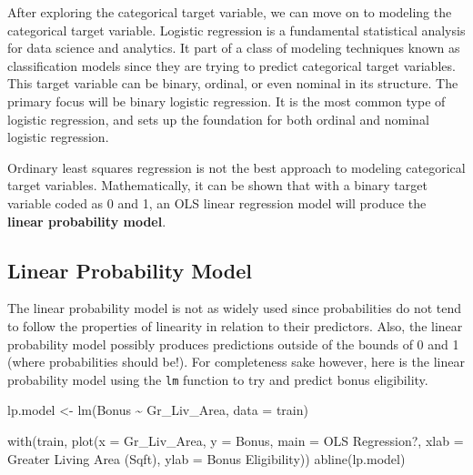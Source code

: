 \documentclass[
  letterpaper,
  DIV=11,
  numbers=noendperiod]{scrreprt}
\newenvironment{Shaded}{\begin{snugshade}}{\end{snugshade}}
\newcommand{\AttributeTok}[1]{\textcolor[rgb]{0.40,0.45,0.13}{#1}}
\newcommand{\FunctionTok}[1]{\textcolor[rgb]{0.28,0.35,0.67}{#1}}
\newcommand{\NormalTok}[1]{\textcolor[rgb]{0.00,0.23,0.31}{#1}}
\newcommand{\OtherTok}[1]{\textcolor[rgb]{0.00,0.23,0.31}{#1}}
\newcommand{\SpecialCharTok}[1]{\textcolor[rgb]{0.37,0.37,0.37}{#1}}
\newcommand{\StringTok}[1]{\textcolor[rgb]{0.13,0.47,0.30}{#1}}
\begin{document}
After exploring the categorical target variable, we can move on to
modeling the categorical target variable. Logistic regression is a
fundamental statistical analysis for data science and analytics. It part
of a class of modeling techniques known as classification models since
they are trying to predict categorical target variables. This target
variable can be binary, ordinal, or even nominal in its structure. The
primary focus will be binary logistic regression. It is the most common
type of logistic regression, and sets up the foundation for both ordinal
and nominal logistic regression.

Ordinary least squares regression is not the best approach to modeling
categorical target variables. Mathematically, it can be shown that with
a binary target variable coded as 0 and 1, an OLS linear regression
model will produce the \textbf{linear probability model}.

\hypertarget{linear-probability-model}{%
\subsection{Linear Probability Model}\label{linear-probability-model}}

The linear probability model is not as widely used since probabilities
do not tend to follow the properties of linearity in relation to their
predictors. Also, the linear probability model possibly produces
predictions outside of the bounds of 0 and 1 (where probabilities should
be!). For completeness sake however, here is the linear probability
model using the \texttt{lm} function to try and predict bonus
eligibility.

\begin{Shaded}
\begin{Highlighting}[]
\NormalTok{lp.model }\OtherTok{\textless{}{-}} \FunctionTok{lm}\NormalTok{(Bonus }\SpecialCharTok{\textasciitilde{}}\NormalTok{ Gr\_Liv\_Area, }\AttributeTok{data =}\NormalTok{ train)}

\FunctionTok{with}\NormalTok{(train, }\FunctionTok{plot}\NormalTok{(}\AttributeTok{x =}\NormalTok{ Gr\_Liv\_Area, }\AttributeTok{y =}\NormalTok{ Bonus,}
               \AttributeTok{main =} \StringTok{\textquotesingle{}OLS Regression?\textquotesingle{}}\NormalTok{,}
               \AttributeTok{xlab =} \StringTok{\textquotesingle{}Greater Living Area (Sqft)\textquotesingle{}}\NormalTok{,}
               \AttributeTok{ylab =} \StringTok{\textquotesingle{}Bonus Eligibility\textquotesingle{}}\NormalTok{))}
\FunctionTok{abline}\NormalTok{(lp.model)}
\end{Highlighting}
\end{Shaded}
\end{document}
